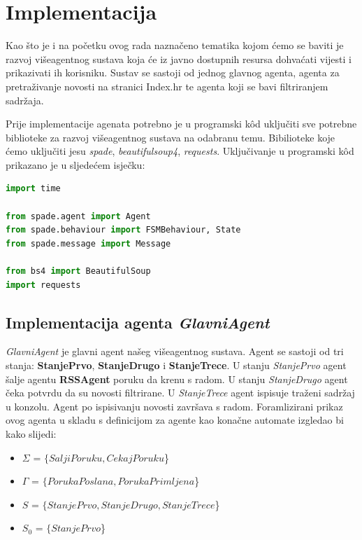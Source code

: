 \documentclass[]{foi} %
\begin{document}
\newpage

\chapter{Implementacija}

Kao što je i na početku ovog rada naznačeno tematika kojom ćemo se baviti je razvoj višeagentnog sustava koja će iz javno dostupnih resursa dohvaćati vijesti i prikazivati ih korisniku. Sustav se sastoji od jednog glavnog agenta, agenta za pretraživanje novosti na stranici Index.hr te agenta koji se bavi filtriranjem sadržaja.

Prije implementacije agenata potrebno je u programski kôd uključiti sve potrebne biblioteke za razvoj višeagentnog sustava na odabranu temu. Bibilioteke koje ćemo uključiti jesu \textit{spade}, \textit{beautifulsoup4}, \textit{requests}. Uključivanje u programski kôd prikazano je u sljedećem isječku:

\begin{lstlisting}[language=Python, caption={Potrebne biblioteke}]
import time

from spade.agent import Agent
from spade.behaviour import FSMBehaviour, State
from spade.message import Message

from bs4 import BeautifulSoup
import requests
\end{lstlisting}

\section{Implementacija agenta \textit{GlavniAgent}}
\textit{GlavniAgent} je glavni agent našeg višeagentnog sustava. Agent se sastoji od tri stanja: \textbf{StanjePrvo}, \textbf{StanjeDrugo} i \textbf{StanjeTrece}. U stanju \textit{StanjePrvo} agent šalje agentu \textbf{RSSAgent} poruku da krenu s radom. U stanju \textit{StanjeDrugo} agent čeka potvrdu da su novosti filtrirane. U \textit{StanjeTrece} agent ispisuje traženi sadržaj u konzolu. Agent po ispisivanju novosti završava s radom. Foramlizirani prikaz ovog agenta u skladu s definicijom za agente kao konačne automate izgledao bi kako slijedi:

\begin{itemize}
  \item \(\Sigma\) = $\{SaljiPoruku, CekajPoruku$\}
  \item \(\Gamma\) = $\{PorukaPoslana, PorukaPrimljena$\}
  \item \(S\) = $\{StanjePrvo, StanjeDrugo, StanjeTrece$\}
  \item \(S_0\) = $\{StanjePrvo$\}
\end{itemize}
\end{document}
